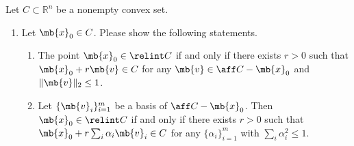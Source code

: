 \begin{exercise}
  Let $C\subset\mathbb{R}^n$ be a nonempty convex set.
  \begin{enumerate}
    \item Let $\mb{x}_0\in C$. Please show the following statements.
      \begin{enumerate}

        \item
          The point $\mb{x}_0\in \relint C$ if and only if there exists $r>0$ such that $\mb{x}_0 +r\mb{v}\in C$ for any $\mb{v}\in\aff C-\mb{x}_0 $ and $\|\mb{v}\|_2\le 1$.
        \item
          Let $\{\mb{v}_i\}_{i=1}^m$ be a basis of $\aff  C-\mb{x}_0$. Then $\mb{x}_0\in\relint C$ if and only if there exists $r>0$ such that $\mb{x}_0+r\sum_{i}\alpha_i \mb{v}_i\in C$ for any $\{\alpha_i\}_{i=1}^m$ with $\sum_i \alpha_i^2\le 1$.


\end{enumerate}
\end{enumerate}
\end{exercise}
